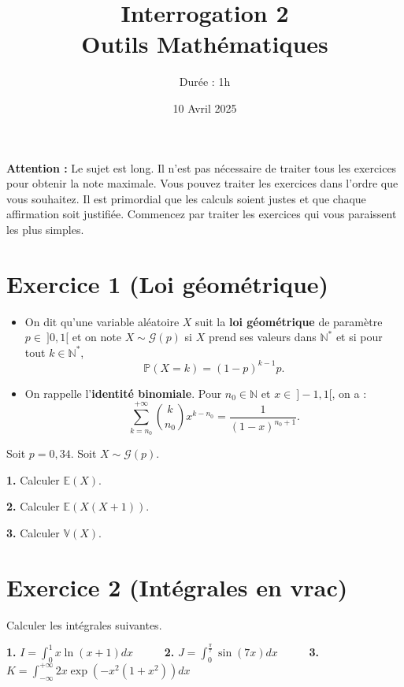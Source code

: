 \documentclass[5pt]{article}
\title{Interrogation 2 \\
Outils Mathématiques}
\author{Durée : 1h}
\date{10 Avril 2025}
\newcommand{\E}{\mathbb{E}}
\newcommand{\prob}{\mathbb{P}}
\begin{document}
\maketitle

\textbf{Attention :} Le sujet est long. Il n'est pas nécessaire de traiter tous les exercices pour obtenir la note maximale. Vous pouvez traiter les exercices dans l'ordre que vous souhaitez. Il est primordial que les calculs soient justes et que chaque affirmation soit justifiée. Commencez par traiter les exercices qui vous paraissent les plus simples.

\section*{Exercice 1 (Loi géométrique)}

\begin{tcolorbox}[colframe=gray!50, colback=white, title=Rappels, fonttitle=\bfseries,
  boxrule=0.5pt, arc=0mm]
\begin{itemize}
    \item On dit qu'une variable aléatoire $X$ suit la \textbf{loi géométrique} de paramètre $p \in \ ]0,1[$ et on note $X \sim \mathcal{G}(p)$ si $X$ prend ses valeurs dans $\mathbb{N}^*$ et si pour tout $k \in \mathbb{N}^*$, 
    \[
    \prob(X = k) = (1-p)^{k-1} p.
    \]

    \item On rappelle l'\textbf{identité binomiale}. Pour $n_0 \in \mathbb{N}$ et $x \in \ ]-1,1[$, on a :
    \[
    \sum_{k=n_0}^{+\infty} \binom{k}{n_0} x^{k - n_0} = \frac{1}{(1 - x)^{n_0 + 1}}.
    \]
\end{itemize}
\end{tcolorbox}

Soit $p=0{,}34$. Soit $X \sim \mathcal{G}(p)$. 

\textbf{1.} Calculer $\E (X)$. 

\textbf{2.} Calculer $\E (X(X+1))$. 

\textbf{3.} Calculer $\mathbb{V} (X)$. 

\section*{Exercice 2 (Intégrales en vrac)}

Calculer les intégrales suivantes.

\textbf{1.} $I=\int_0^1 x \ln (x+1) dx$ \ \ \ \ \ \textbf{2.} $J=\int_0^{\frac{\pi}{7}} \sin (7x) dx$ \ \ \ \ \ \textbf{3.} $K = \int_{- \infty}^{+ \infty} 2x \exp{\left(-x^2(1+x^2) \right)}dx$
\end{document}
